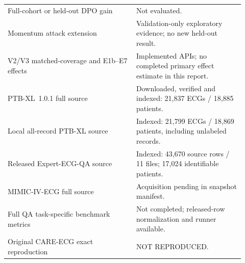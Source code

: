 \begin{longtable}{p{0.50\linewidth}p{0.42\linewidth}}
Full-cohort or held-out DPO gain & Not evaluated.\\
Momentum attack extension & Validation-only exploratory evidence; no new held-out result.\\
V2/V3 matched-coverage and E1b--E7 effects & Implemented APIs; no completed primary effect estimate in this report.\\
PTB-XL~1.0.1 full source & Downloaded, verified and indexed: 21,837 ECGs / 18,885 patients.\\
Local all-record PTB-XL source & Indexed: 21,799 ECGs / 18,869 patients, including unlabeled records.\\
Released Expert-ECG-QA source & Indexed: 43,670 source rows / 11 files; 17,024 identifiable patients.\\
MIMIC-IV-ECG full source & Acquisition pending in snapshot manifest.\\
Full QA task-specific benchmark metrics & Not completed; released-row normalization and runner available.\\
Original CARE-ECG exact reproduction & NOT REPRODUCED.\\
\bottomrule
\end{longtable}

